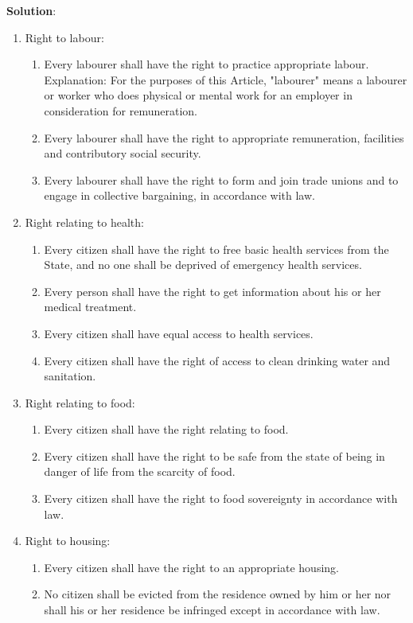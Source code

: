 \documentclass[
]{book}
\newenvironment{solution}{ {\bfseries Solution}:}{}
\begin{document}
\begin{questions}
\begin{solution}
\begin{enumerate}
\item Right to labour:
\begin{enumerate}
\item Every labourer shall have the right to practice appropriate labour. Explanation: For the purposes of this Article, "labourer" means a labourer or worker who does physical or mental work for an employer in consideration for remuneration.
\item Every labourer shall have the right to appropriate remuneration, facilities and contributory social security.
\item Every labourer shall have the right to form and join trade unions and to engage in collective bargaining, in accordance with law.
\end{enumerate}

\item Right relating to health:
\begin{enumerate}
\item Every citizen shall have the right to free basic health services from the State, and no one shall be deprived of emergency health services.
\item Every person shall have the right to get information about his or her medical treatment.
\item Every citizen shall have equal access to health services.
\item Every citizen shall have the right of access to clean drinking water and sanitation.
\end{enumerate}

\item Right relating to food:
\begin{enumerate}
\item Every citizen shall have the right relating to food.
\item Every citizen shall have the right to be safe from the state of being in danger of life from the scarcity of food.
\item Every citizen shall have the right to food sovereignty in accordance with law.
\end{enumerate}

\item Right to housing:
\begin{enumerate}
\item Every citizen shall have the right to an appropriate housing.
\item No citizen shall be evicted from the residence owned by him or her nor shall his or her residence be infringed except in accordance with law.
\end{enumerate}


\end{enumerate}
\end{solution}
\end{questions}
\end{document}
